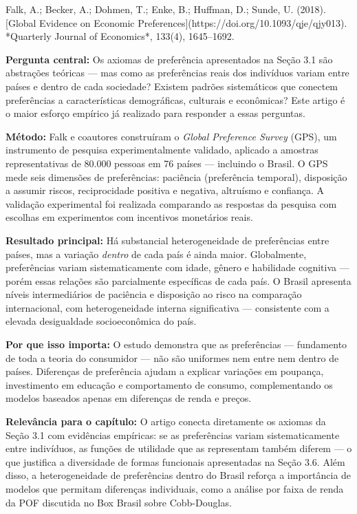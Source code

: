 \documentclass[11pt,twoside,openright]{book}
\begin{document}
\begin{pesquisabox}{Falk, A.; Becker, A.; Dohmen, T.; Enke, B.; Huffman, D.; Sunde, U. (2018). [Global Evidence on Economic Preferences](https://doi.org/10.1093/qje/qjy013). *Quarterly Journal of Economics*, 133(4), 1645–1692.}

\textbf{Pergunta central:} Os axiomas de preferência apresentados na
Seção 3.1 são abstrações teóricas --- mas como as preferências reais dos
indivíduos variam entre países e dentro de cada sociedade? Existem
padrões sistemáticos que conectem preferências a características
demográficas, culturais e econômicas? Este artigo é o maior esforço
empírico já realizado para responder a essas perguntas.

\textbf{Método:} Falk e coautores construíram o \emph{Global Preference
Survey} (GPS), um instrumento de pesquisa experimentalmente validado,
aplicado a amostras representativas de 80.000 pessoas em 76 países ---
incluindo o Brasil. O GPS mede seis dimensões de preferências: paciência
(preferência temporal), disposição a assumir riscos, reciprocidade
positiva e negativa, altruísmo e confiança. A validação experimental foi
realizada comparando as respostas da pesquisa com escolhas em
experimentos com incentivos monetários reais.

\textbf{Resultado principal:} Há substancial heterogeneidade de
preferências entre países, mas a variação \emph{dentro} de cada país é
ainda maior. Globalmente, preferências variam sistematicamente com
idade, gênero e habilidade cognitiva --- porém essas relações são
parcialmente específicas de cada país. O Brasil apresenta níveis
intermediários de paciência e disposição ao risco na comparação
internacional, com heterogeneidade interna significativa --- consistente
com a elevada desigualdade socioeconômica do país.

\textbf{Por que isso importa:} O estudo demonstra que as preferências
--- fundamento de toda a teoria do consumidor --- não são uniformes nem
entre nem dentro de países. Diferenças de preferência ajudam a explicar
variações em poupança, investimento em educação e comportamento de
consumo, complementando os modelos baseados apenas em diferenças de
renda e preços.

\textbf{Relevância para o capítulo:} O artigo conecta diretamente os
axiomas da Seção 3.1 com evidências empíricas: se as preferências variam
sistematicamente entre indivíduos, as funções de utilidade que as
representam também diferem --- o que justifica a diversidade de formas
funcionais apresentadas na Seção 3.6. Além disso, a heterogeneidade de
preferências dentro do Brasil reforça a importância de modelos que
permitam diferenças individuais, como a análise por faixa de renda da
POF discutida no Box Brasil sobre Cobb-Douglas.

\end{pesquisabox}
\end{document}
